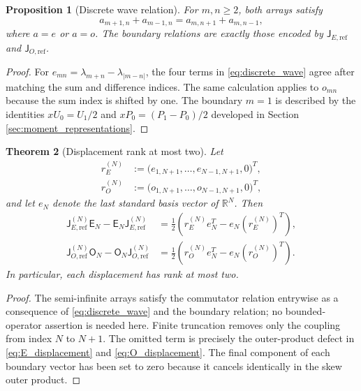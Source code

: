 \documentclass[preprint,12pt]{elsarticle}
\numberwithin{equation}{section}
\theoremstyle{plain}
\newtheorem{theorem}{Theorem}[section]
\newtheorem{proposition}[theorem]{Proposition}
\theoremstyle{definition}
\theoremstyle{remark}
\newcommand{\E}{\mathsf E}
\newcommand{\Omat}{\mathsf O}
\newcommand{\J}{\mathsf J}
\begin{document}
\begin{proposition}[Discrete wave relation]
\label{prop:discrete_wave}
For $m,n\ge2$, both arrays satisfy
\begin{equation}
a_{m+1,n}+a_{m-1,n}
=a_{m,n+1}+a_{m,n-1},
\label{eq:discrete_wave}
\end{equation}
where $a=e$ or $a=o$. The boundary relations are exactly those encoded by $\J_{E,\mathrm{ref}}$ and $\J_{O,\mathrm{ref}}$.
\end{proposition}

\begin{proof}
For $e_{mn}=\lambda_{m+n}-\lambda_{|m-n|}$, the four terms in \eqref{eq:discrete_wave} agree after matching the sum and difference indices. The same calculation applies to $o_{mn}$ because the sum index is shifted by one. The boundary $m=1$ is described by the identities $xU_0=U_1/2$ and $xP_0=(P_1-P_0)/2$ developed in Section \ref{sec:moment_representations}.
\end{proof}

\begin{theorem}[Displacement rank at most two]
\label{thm:rank_two_displacement}
Let
\begin{align}
r_E^{(N)}&:=\bigl(e_{1,N+1},\dots,e_{N-1,N+1},0\bigr)^T,
\label{eq:rE_definition}\\
r_O^{(N)}&:=\bigl(o_{1,N+1},\dots,o_{N-1,N+1},0\bigr)^T,
\label{eq:rO_definition}
\end{align}
and let $e_N$ denote the last standard basis vector of $\mathbb R^N$. Then
\begin{align}
\J_{E,\mathrm{ref}}^{(N)}\E_N-\E_N\J_{E,\mathrm{ref}}^{(N)}
&=\frac12\left(r_E^{(N)}e_N^T-e_N(r_E^{(N)})^T\right),
\label{eq:E_displacement}\\
\J_{O,\mathrm{ref}}^{(N)}\Omat_N-\Omat_N\J_{O,\mathrm{ref}}^{(N)}
&=\frac12\left(r_O^{(N)}e_N^T-e_N(r_O^{(N)})^T\right).
\label{eq:O_displacement}
\end{align}
In particular, each displacement has rank at most two.
\end{theorem}

\begin{proof}
The semi-infinite arrays satisfy the commutator relation entrywise as a consequence of \eqref{eq:discrete_wave} and the boundary relation; no bounded-operator assertion is needed here. Finite truncation removes only the coupling from index $N$ to $N+1$. The omitted term is precisely the outer-product defect in \eqref{eq:E_displacement} and \eqref{eq:O_displacement}. The final component of each boundary vector has been set to zero because it cancels identically in the skew outer product.
\end{proof}
\end{document}
